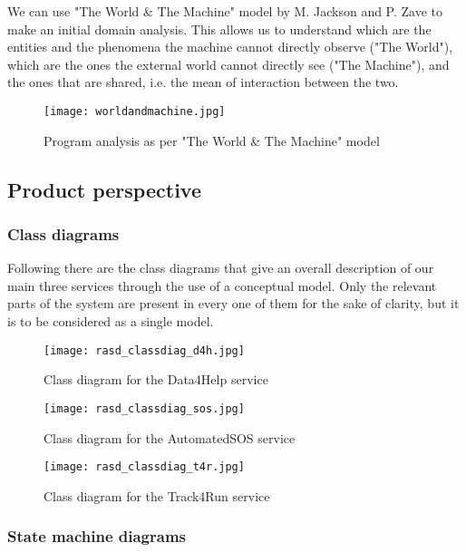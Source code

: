 \documentclass[../main.tex]{subfiles}
\begin{document}
We can use "The World \& The Machine" model by M. Jackson and P. Zave to make an initial domain analysis. This allows us to understand which are the entities and the phenomena the machine cannot directly observe ("The World"), which are the ones the external world cannot directly see ("The Machine"), and the ones that are shared, i.e. the mean of interaction between the two.

\begin{figure}[h!]
	\texttt{[image: worldandmachine.jpg]}
	\caption{Program analysis as per "The World \& The Machine" model}
	\label{fig:worldandmachine}
\end{figure}

\subsection{Product perspective}

\subsubsection{Class diagrams}

Following there are the class diagrams that give an overall description of our main three services through the use of a conceptual model. Only the relevant parts of the system are present in every one of them for the sake of clarity, but it is to be considered as a single model.
\newpage
\thispagestyle{empty} %
\begin{figure}[H]
	\texttt{[image: rasd\_classdiag\_d4h.jpg]}
	\caption{Class diagram for the Data4Help service}
	\label{fig:classdiag_d4h}
\end{figure}
\newpage
\thispagestyle{empty}
\begin{figure}[H]
	\texttt{[image: rasd\_classdiag\_sos.jpg]}
	\caption{Class diagram for the AutomatedSOS service}
	\label{fig:classdiag_sos}
\end{figure}
\newpage
\thispagestyle{empty}
\begin{figure}[H]
	\texttt{[image: rasd\_classdiag\_t4r.jpg]}
	\caption{Class diagram for the Track4Run service}
	\label{fig:classdiag_t4r}
\end{figure}
\newpage

\subsubsection{State machine diagrams}
\end{document}
